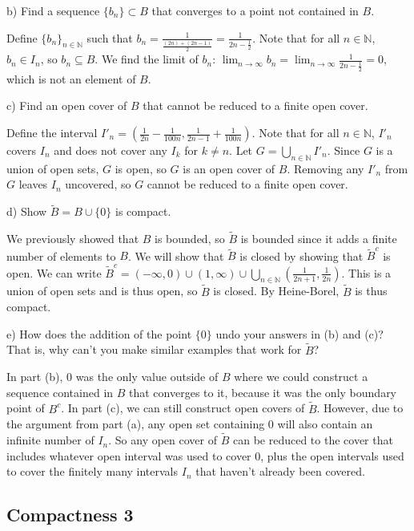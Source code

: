 \documentclass[11pt]{article}
\newcommand{\N}{\mathbb{N}}
\begin{document}
b) Find a sequence $\{b_n\}\subset B$ that converges to a point not contained in $B$.

Define $\{b_n\}_{n\in\N}$ such that $b_n = \frac{1}{\frac{(2n)+(2n-1)}{2}}
= \frac{1}{2n-\frac{1}{2}}$. Note that for all $n\in\N$, $b_n\in I_n$, so
${b_n}\subseteq B$. We find the limit of $b_n$:
$\lim_{n\to\infty}b_n=\lim_{n\to\infty}\frac{1}{2n-\frac{1}{2}}=0$, which is
not an element of $B$.

c) Find an open cover of $B$ that cannot be reduced to a finite open cover. 

Define the interval
$I'_n = (\frac{1}{2n}-\frac{1}{100n}, \frac{1}{2n-1}+\frac{1}{100n})$.
Note that for all $n\in\N$, $I'_n$ covers $I_n$ and does not cover any
$I_k$ for $k\neq n$. Let $G=\bigcup_{n\in\N}I'_n$. Since $G$ is a union
of open sets, $G$ is open, so $G$ is an open cover of $B$. Removing any
$I'_n$ from $G$ leaves $I_n$ uncovered, so $G$ cannot be reduced to a 
finite open cover.

d) Show $\tilde B = B\cup\{0\}$ is compact.

We previously showed that $B$ is bounded, so $\tilde B$ is bounded since
it adds a finite number of elements to $B$. We will show that $\tilde B$ is
closed by showing that $\tilde B^c$ is open. We can write $\tilde B^c=
(-\infty,0)\cup(1,\infty)\cup
\bigcup_{n\in\N}\left(\frac{1}{2n+1},\frac{1}{2n}\right)$. This is a union
of open sets and is thus open, so $\tilde B$ is closed. By Heine-Borel,
$\tilde B$ is thus compact.

e) How does the addition of the point $\{0\}$ undo your answers in (b) and (c)? That is, why can't you make similar examples that work for $\tilde B$?

In part (b), 0 was the only value outside of $B$ where we could construct
a sequence contained in $B$ that converges to it, because it was the only
boundary point of $B^c$. In part (c), we can still construct open covers
of $\tilde B$. However, due to the argument from part (a), any open set
containing 0 will also contain an infinite number of $I_n$. So any open
cover of $\tilde B$ can be reduced to the cover that includes whatever
open interval was used to cover 0, plus the open intervals
used to cover the finitely many intervals $I_n$ that haven't already been
covered.


\subsection*{Compactness 3}
\end{document}
